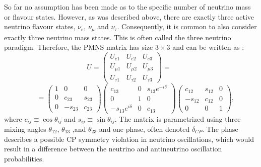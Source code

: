 So far no assumption has been made as to the specific number of neutrino mass or flavour states. However, as was described above, there are exactly three active neutrino flavour states, $\nu_e$, $\nu_\mu$ and $\nu_\tau$. Consequently, it is common to also consider exactly three neutrino mass states. This is often called the three neutrino paradigm. Therefore, the \gls{PMNS} matrix has size $3\times 3$ and can be written as \cite{FundamentalsOfNeutrinoPhysics.pdf}:
\[
U=
\begin{pmatrix}
 U_{e1}     & U_{e2}     & U_{e3}    \\
 U_{\mu 1}  & U_{\mu 2}  & U_{\mu 3} \\
 U_{\tau 1} & U_{\tau 2} & U_{\tau 3}
\end{pmatrix}
=\,\,\,
\]
\begin{equation}\label{param3}
\,\,\,\,\,\,\,\, =
\begin{pmatrix}
 1 & 0       & 0      \\
 0 & c_{23}  & s_{23} \\
 0 & -s_{23} & c_{23}
\end{pmatrix}
\begin{pmatrix}
 c_{13}              & 0 & s_{13}e^{-i\delta} \\
 0                   & 1 & 0                  \\
 -s_{13}e^{i\delta} & 0 & c_{13}
\end{pmatrix}
\begin{pmatrix}
 c_{12}  & s_{12} & 0 \\
 -s_{12} & c_{12} & 0 \\
 0       & 0      & 1
\end{pmatrix},
\end{equation}
where $c_{ij}\equiv\cos\theta_{ij}$ and $s_{ij}\equiv\sin\theta_{ij}$. The matrix is parametrized using three mixing angles $\theta_{12}$, $\theta_{13}$ ,and $\theta_{23}$ and one phase, often denoted $\delta_{CP}$. The phase describes a possible \gls{CP} symmetry violation in neutrino oscillations, which would result in a difference between the neutrino and antineutrino oscillation probabilities.

